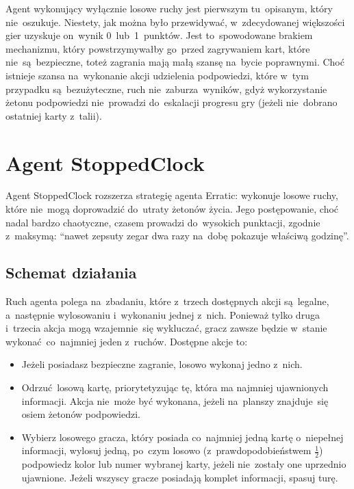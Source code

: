 \documentclass[declaration,shortabstract,inz]{iithesis}
\begin{document}
Agent wykonujący wyłącznie losowe ruchy jest pierwszym tu~opisanym, który nie~oszukuje. Niestety, jak można było przewidywać, w~zdecydowanej większości gier uzyskuje on~wynik 0~lub~1~punktów. Jest to~spowodowane brakiem mechanizmu, który powstrzymywałby go~przed zagrywaniem kart, które nie~są~bezpieczne, toteż zagrania mają małą szansę na~bycie poprawnymi. Choć istnieje szansa na~wykonanie akcji udzielenia podpowiedzi, które w~tym przypadku są~bezużyteczne, ruch nie~zaburza wyników, gdyż wykorzystanie żetonu podpowiedzi nie~prowadzi do~eskalacji progresu gry (jeżeli nie~dobrano ostatniej karty z~talii).

\section{Agent StoppedClock}

Agent StoppedClock rozszerza strategię agenta Erratic: wykonuje losowe ruchy, które nie~mogą doprowadzić do~utraty żetonów życia. Jego postępowanie, choć nadal bardzo chaotyczne, czasem prowadzi do~wysokich punktacji, zgodnie z~maksymą: ``nawet zepsuty zegar dwa razy na~dobę pokazuje właściwą godzinę''.

\subsection*{Schemat działania}

Ruch agenta polega na~zbadaniu, które z~trzech dostępnych akcji są~legalne, a~następnie wylosowaniu i~wykonaniu jednej z~nich. Ponieważ tylko druga i~trzecia akcja mogą wzajemnie~się wykluczać, gracz zawsze będzie w~stanie wykonać co~najmniej jeden z~ruchów. Dostępne akcje to:

\begin{itemize}
	\item Jeżeli posiadasz bezpieczne zagranie, losowo wykonaj jedno z~nich.
	\item Odrzuć losową kartę, priorytetyzując tę, która ma najmniej ujawnionych informacji. Akcja nie~może być wykonana, jeżeli na~planszy znajduje~się osiem żetonów podpowiedzi.
	\item Wybierz losowego gracza, który posiada co~najmniej jedną kartę o~niepełnej informacji, wylosuj jedną, po~czym losowo (z~prawdopodobieństwem $\frac{1}{2}$) podpowiedz kolor lub numer wybranej karty, jeżeli nie~zostały one uprzednio ujawnione. Jeżeli wszyscy gracze posiadają komplet informacji, spasuj turę.
\end{itemize}
\end{document}
